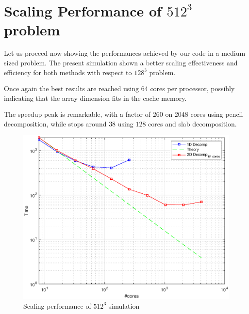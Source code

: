 \section{Scaling Performance of $512^3$ problem}
Let us proceed now showing the performances achieved by our code in a medium sized problem.
The present simulation shown a better scaling effectiveness and efficiency for both methods with respect to $128^{3}$ problem. 
\par
Once again the best results are reached using 64 cores per processor, possibly indicating that the array dimension fits in the cache memory.
\par
The speedup peak is remarkable, with a factor of $260$ on $2048$ cores using pencil decomposition, while stops around $38$ using $128$ cores and slab decomposition. \\
\par

\begin{figure}
\begin{center}
\includegraphics[scale=0.6]{grafici/5121}
\caption{Scaling performance of $512^3$ simulation}
\label{5121}
\end{center}
\end{figure}

